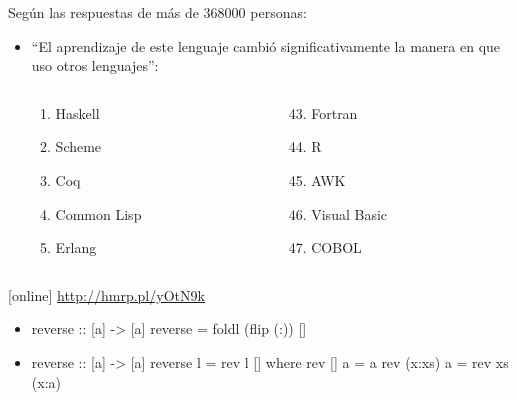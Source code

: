 \documentclass[spanish]{beamer}
\begin{document}
\begin{frame}
  Según las respuestas de más de 368000 personas:
  \begin{itemize}
  \item
    ``El aprendizaje de este lenguaje cambió significativamente la
    manera en que uso otros lenguajes'':
    \begin{columns}[T]
      \begin{column}{3cm}
        \begin{enumerate}
        \item Haskell
        \item Scheme
        \item Coq
        \item Common Lisp
        \item Erlang
        \end{enumerate}
      \end{column}
      \begin{column}{3cm}
        \begin{enumerate}
        \setcounter{enumi}{42}
        \item Fortran
        \item R
        \item AWK
        \item Visual Basic
        \item COBOL
        \end{enumerate}
      \end{column}
    \end{columns}
  \end{itemize}
  \begin{thebibliography}{}
  [online]
    \newblock \url{http://hmrp.pl/yOtN9k}
  \end{thebibliography}
\end{frame}


\begin{frame}[fragile]
  \begin{itemize}
  \item
    \begin{code}
reverse :: [a] -> [a]
reverse =  foldl (flip (:)) []
    \end{code}
  \item
    \begin{code}
reverse :: [a] -> [a]
reverse l = rev l []
  where
    rev []     a = a
    rev (x:xs) a = rev xs (x:a)
    \end{code}
  \end{itemize}
\end{frame}

\end{document}
